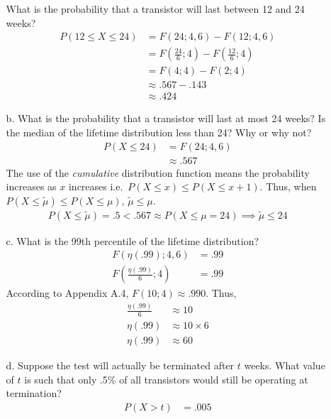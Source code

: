 \documentclass[letterpaper,12pt]{article}
\begin{document}
\begin{enumerate}
\begin{enumerate}
        What is the probability that a transistor will last between 12 and 24 weeks?
        \begin{align*}
          P(12 \le X \le 24) &= F(24; 4, 6) - F(12; 4, 6) \\
          &= F\left(\frac{24}{6}; 4\right) - F\left(\frac{12}{6}; 4\right) \\
          &= F(4; 4) - F(2; 4) \\
          &\approx .567 - .143 \\
          &\approx .424
        \end{align*}
      \item[b.]
        What is the probability that a transistor will last at most 24 weeks? Is the median of the lifetime distribution less than 24? Why or why not?
        \begin{align*}
          P(X \le 24) &= F(24; 4, 6) \\
          &\approx .567
        \end{align*}
        The use of the \textit{cumulative} distribution function means the probability increases as $x$ increases i.e.\ $P(X \le x) \le P(X \le x + 1)$. Thus, when $P(X \le \tilde{\mu}) \le P(X \le \mu)$, $\tilde{\mu} \le \mu$.
        \begin{align*}
          P(X \le \tilde{\mu}) = .5 < .567 \approx P(X \le \mu = 24) \implies \tilde{\mu} \le 24
        \end{align*}
      \item[c.]
        What is the 99th percentile of the lifetime distribution?
        \begin{align*}
          F(\eta(.99); 4, 6) &= .99 \\
          F\left(\frac{\eta(.99)}{6}; 4\right) &= .99
        \end{align*}
        According to Appendix A.4, $F(10; 4) \approx .990$. Thus,
        \begin{align*}
          \frac{\eta(.99)}{6} &\approx 10 \\
          \eta(.99) &\approx 10 \times 6 \\
          \eta(.99) &\approx 60
        \end{align*}
      \item[d.]
        Suppose the test will actually be terminated after $t$ weeks. What value of $t$ is such that only .5\% of all transistors would still be operating at termination?
        \begin{align*}
          P(X > t) &= .005 \\

\end{align*}
\end{enumerate}
\end{enumerate}
\end{document}
